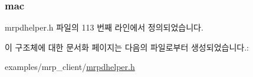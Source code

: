 \subsubsection[{\texorpdfstring{mac}{mac}}]{ mac}\hypertarget{structmrpdhelper__mmrp__notify_a920661745231ffa48515d83a8953e76f}{}\label{structmrpdhelper__mmrp__notify_a920661745231ffa48515d83a8953e76f}


mrpdhelper.\+h 파일의 113 번째 라인에서 정의되었습니다.



이 구조체에 대한 문서화 페이지는 다음의 파일로부터 생성되었습니다.\+:\begin{DoxyCompactItemize}
\item 
examples/mrp\+\_\+client/\hyperlink{mrpdhelper_8h}{mrpdhelper.\+h}\end{DoxyCompactItemize}
